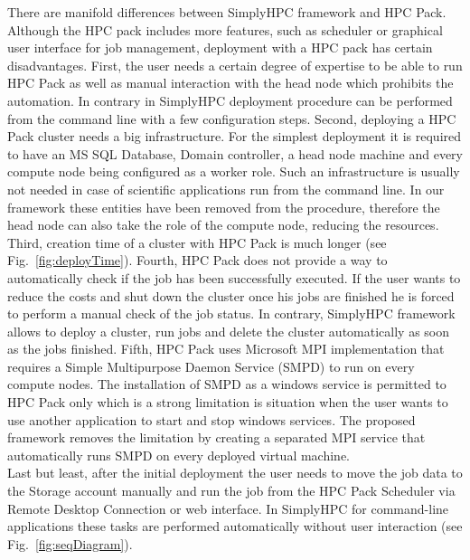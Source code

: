 \documentclass[3p,times]{elsarticle}
\begin{document}
There are manifold differences between SimplyHPC framework and HPC Pack. Although the HPC pack includes more features, such as scheduler or graphical user interface for job management, deployment with a HPC pack has certain disadvantages. First, the user needs a certain degree of expertise to be able to run HPC Pack as well as manual interaction with the head node which prohibits the automation. In contrary in SimplyHPC deployment procedure can be performed from the command line with a few configuration steps. Second, deploying a HPC Pack cluster needs a big infrastructure. For the simplest deployment it is required to have an MS SQL Database, Domain controller, a head node machine and every compute node being configured as a worker role. Such an infrastructure is usually not needed in case of scientific applications run from the command line. In our framework these entities have been removed from the procedure, therefore the head node can also take the role of the compute node, reducing the resources. \\
Third, creation time of a cluster with HPC Pack is much longer (see Fig.~\ref{fig:deployTime}). Fourth, HPC Pack does not provide a way to automatically check if the job has been successfully executed. If the user wants to reduce the costs and shut down the cluster once his jobs are finished he is forced to perform a manual check of the job status. In contrary, SimplyHPC framework allows to deploy a cluster, run jobs and delete the cluster automatically as soon as the jobs finished. %
Fifth, HPC Pack uses Microsoft MPI implementation that requires a Simple Multipurpose Daemon Service (SMPD) to run on every compute nodes. The installation of SMPD as a windows service is permitted to HPC Pack only which is a strong limitation is situation when the user wants to use another application to start and stop windows services. The proposed framework removes the limitation by creating a separated MPI service that automatically runs SMPD on every deployed virtual machine. \\
Last but least, after the initial deployment the user needs to move the job data to the Storage account manually and run the job from the HPC Pack Scheduler via Remote Desktop Connection or web interface. In SimplyHPC for command-line applications these tasks are performed automatically without user interaction (see Fig.~\ref{fig:seqDiagram}).
 
\end{document}
